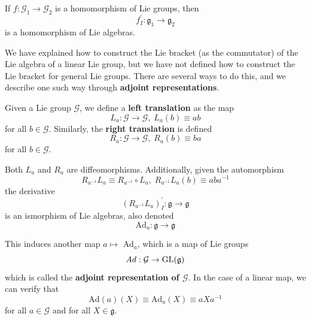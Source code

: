   \begin{proposition}
    If $f: \mathcal{G}_1 \rightarrow \mathcal{G}_2$ is a homomorphism of Lie groups, then 
    \begin{equation}
      f_I^\prime: \mathfrak{g}_1 \rightarrow \mathfrak{g}_2
    \end{equation}
    is a homomorphism of Lie algebras. 
  \end{proposition}

  We have explained how to construct the Lie bracket (as the commutator) of the Lie algebra of a linear Lie group, but we have not defined how to construct the Lie bracket for general Lie groups. There are several ways to do this, and we describe one such way through \textbf{adjoint representations}. 

  \begin{definition}
    Given a Lie group $\mathcal{G}$, we define a \textbf{left translation} as the map
    \begin{equation}
      L_a: \mathcal{G} \rightarrow \mathcal{G}, \; L_a (b) \equiv a b
    \end{equation}
    for all $b \in \mathcal{G}$. Similarly, the \textbf{right translation} is defined
    \begin{equation}
      R_a: \mathcal{G} \rightarrow \mathcal{G}, \; R_a (b) \equiv b a
    \end{equation}
    for all $b \in \mathcal{G}$. 
  \end{definition}

  Both $L_a$ and $R_a$ are diffeomorphisms. Additionally, given the automorphism
  \begin{equation}
    R_{a^{-1}} L_a \equiv R_{a^{-1}} \circ L_a, \; R_{a^{-1}} L_a (b) \equiv a b a^{-1}
  \end{equation}
  the derivative
  \begin{equation}
    (R_{a^{-1}} L_a)^\prime_I: \mathfrak{g} \rightarrow \mathfrak{g}
  \end{equation}
  is an ismorphism of Lie algebras, also denoted 
  \begin{equation}
    \text{Ad}_a: \mathfrak{g} \rightarrow \mathfrak{g}
  \end{equation}

  \begin{definition}
    This induces another map $a \mapsto$ Ad$_a$, which is a map of Lie groups
    \begin{equation}
      Ad: \mathcal{G} \rightarrow \operatorname{GL}(\mathcal{\mathfrak{g}})
    \end{equation}
    which is called the \textbf{adjoint representation of $\mathcal{G}$}. In the case of a linear map, we can verify that 
    \begin{equation}
      \text{Ad}(a) (X) \equiv \text{Ad}_a (X) \equiv a X a^{-1}
    \end{equation}
    for all $a \in \mathcal{G}$ and for all $X \in \mathfrak{g}$. 
  \end{definition}

